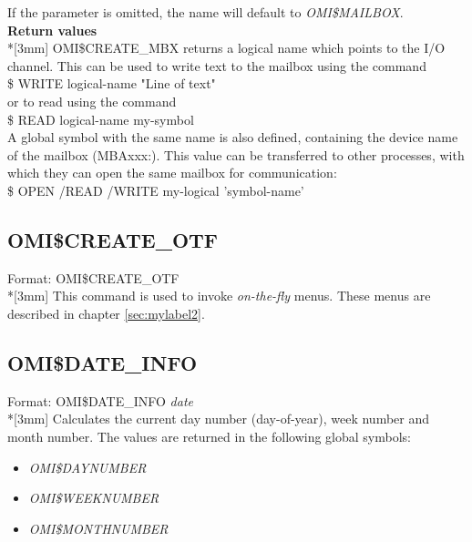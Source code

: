 \documentclass[a4paper]{book}
\renewcommand{\indent}{\hspace*{5mm}}
\begin{document}
If the parameter is omitted, the name will default to 
\textsl{OMI{\$}MAILBOX}.\\[3mm]
\textbf{Return values}\\*[3mm]
OMI{\$}CREATE{\_}MBX
returns a logical name which points to the I/O channel. This can be used to 
write text to the mailbox using the command \\
\indent\textsf{{\$} WRITE logical-name "Line of text"} \\
or to read using the command \\
\indent\textsf{{\$} READ logical-name my-symbol} \\
A global symbol with the same name is also defined, containing the device 
name of the mailbox (MBAxxx:). This value can be transferred to other 
processes, with which they can open the same mailbox for communication: \\
\indent\textsf{{\$} OPEN /READ /WRITE my-logical 'symbol-name'}

\subsection{OMI{\$}CREATE{\_}OTF}
\label{subsubsec:mylabel48}

\indent Format: \textsf{OMI{\$}CREATE{\_}OTF}\\*[3mm]
This command is used to invoke \textit{on-the-fly} menus. These menus are described in chapter 
\ref{sec:mylabel2}.

\subsection{OMI{\$}DATE{\_}INFO}
\label{subsubsec:mylabel49}

\indent Format: \textsf{OMI{\$}DATE{\_}INFO \textit{date}}\\*[3mm]
Calculates the current day number (day-of-year), week number and month 
number. The values are returned in the following global symbols: \\
\begin{itemize}
\item \textsl{OMI{\$}DAYNUMBER}

\item \textsl{OMI{\$}WEEKNUMBER}

\item \textsl{OMI{\$}MONTHNUMBER}
\end{itemize}
\end{document}
